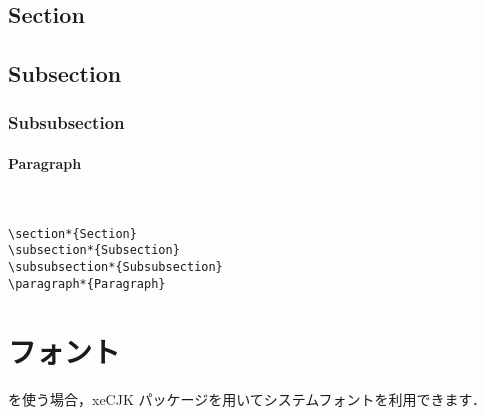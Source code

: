 \documentclass[xelatex,ja=standard,b5j,8pt,magstyle=nomag*,japaram={units}]{bxjsarticle}
\begin{document}
\begin{multicols}{2}
\section*{Section}
\subsection*{Subsection}
\subsubsection*{Subsubsection}
\paragraph*{Paragraph}\mbox{}\\

\columnbreak

\begin{lstlisting}
\section*{Section}
\subsection*{Subsection}
\subsubsection*{Subsubsection}
\paragraph*{Paragraph}
\end{lstlisting}

\end{multicols}

\ifxetex
\section{フォント}

\XeLaTeX を使う場合，xeCJK パッケージを用いてシステムフォントを利用できます．
\end{document}
